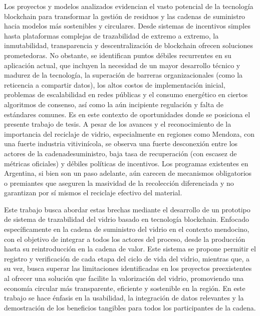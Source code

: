 Los proyectos y modelos analizados evidencian el vasto potencial de la tecnología blockchain para transformar la gestión de residuos y las cadenas de suministro hacia modelos más sostenibles y circulares. Desde sistemas de incentivos simples hasta plataformas complejas de trazabilidad de extremo a extremo, la inmutabilidad, transparencia y descentralización de blockchain ofrecen soluciones prometedoras. No obstante, se identifican puntos débiles recurrentes en su aplicación actual, que incluyen la necesidad de un mayor desarrollo técnico y madurez de la tecnología, la superación de barreras organizacionales (como la reticencia a compartir datos), los altos costos de implementación inicial, problemas de escalabilidad en redes públicas y el consumo energético en ciertos algoritmos de consenso, así como la aún incipiente regulación y falta de estándares comunes. Es en este contexto de oportunidades donde se posiciona el presente trabajo de tesis. A pesar de los avances y el reconocimiento de la importancia del reciclaje de vidrio, especialmente en regiones como Mendoza, con una fuerte industria vitivinícola, se observa una fuerte desconexión entre los actores de la \gls{cadenadesuministro}, baja tasa de recuperación (con escasez de métricas oficiales) y débiles políticas de incentivos. Los programas existentes en Argentina, si bien son un paso adelante, aún carecen de mecanismos obligatorios o premiantes que aseguren la masividad de la recolección diferenciada y no garantizan por sí mismos el reciclaje efectivo del material.

Este trabajo busca abordar estas brechas mediante el desarrollo de un prototipo de sistema de trazabilidad del vidrio basado en tecnología blockchain. Enfocado específicamente en la cadena de suministro del vidrio en el contexto mendocino, con el objetivo de integrar a todos los actores del proceso, desde la producción hasta su reintroducción en la cadena de valor. Este sistema se propone permitir el registro y verificación de cada etapa del ciclo de vida del vidrio, mientras que, a su vez, busca superar las limitaciones identificadas en los proyectos preexistentes al ofrecer una solución que facilite la valorización del vidrio, promoviendo una economía circular más transparente, eficiente y sostenible en la región. En este trabajo se hace énfasis en la usabilidad, la integración de datos relevantes y la demostración de los beneficios tangibles para todos los participantes de la cadena.
